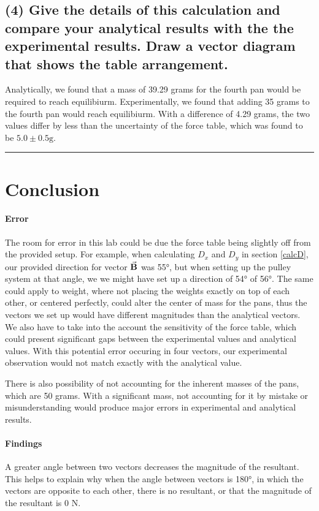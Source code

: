 \documentclass{article}
\begin{document}
\subsection*{\normalsize(4) Give the details of this calculation and compare your analytical results 
with the the experimental results. Draw a vector diagram that shows the table arrangement.}
Analytically, we found that a mass of 39.29 grams for the fourth pan would be required to 
reach equilibiurm. Experimentally, we found that adding 35 grams to the fourth pan would 
reach equilibiurm. With a difference of 4.29 grams, the two values differ by less than 
the uncertainty of the force table, which was found to be $5.0\pm0.5\mathrm{g}$. 

\bigskip 
\hrule 

\section{Conclusion}
\paragraph{Error} The room for error in this lab could be due the force table being 
slightly off from the provided setup. For example, when calculating $D_x$ and $D_y$ in section 
\ref{calcD}, our provided direction for vector $\va{B}$ was \ang{55}, but when setting up the 
pulley system at that angle, we we might have set up a direction of \ang{54} of \ang{56}. The same 
could apply to weight, where not placing the weights exactly on top of each other, or centered perfectly, 
could alter the center of mass for the pans, thus the vectors we set up would have different magnitudes 
than the analytical vectors. We also have to take into the account the sensitivity of the force table, which
could present significant gaps between the experimental values and analytical values. 
With this potential error occuring in four vectors, our experimental observation would not match exactly with the 
analytical value.

There is also possibility of not accounting for the inherent masses of the pans, which are 50 grams.
With a significant mass, not accounting for it by mistake or misunderstanding would produce major 
errors in experimental and analytical results.

\paragraph{Findings} A greater angle between two vectors decreases the magnitude of the 
resultant. This helps to explain why when the angle between vectors is \ang{180}, in which 
the vectors are opposite to each other, there is no resultant, or that the magnitude of the 
resultant is 0 N.
\end{document}

